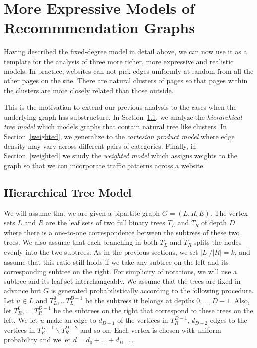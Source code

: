 \section{More Expressive Models of Recommmendation Graphs}

Having described the fixed-degree model in detail above, we can now
use it as a template for the analysis of three more richer, more
expressive and realistic models. In practice, websites can not pick
edges uniformly at random from all the other pages on the site. There
are natural clusters of pages so that pages within the clusters are
more closely related than those outside. \vs

This is the motivation to extend our previous analysis to the cases
when the underlying graph has substructure.  In
Section~\ref{hierarchy}, we analyze the {\em hierarchical tree model}
which models graphs that contain natural tree like clusters.  In
Section~\ref{weighted}, we generalize to the {\em cartesian product model}
where edge density may vary across different pairs of
categories. Finally, in Section~\ref{weighted} we study the {\em
  weighted model} which assigns weights to the graph so that we can
incorporate traffic patterns across a website.

\subsection{Hierarchical Tree Model}
\label{hierarchy}
We will assume that we are given a bipartite graph $G=(L,R,E)$. The vertex sets $L$
and $R$ are the leaf sets of two full binary trees $T_L$ and $T_R$ of
depth $D$ where there is a one-to-one correspondence between the
subtrees of these two trees. We also assume that each branching in
both $T_L$ and $T_R$ splits the nodes evenly into the two
subtrees. As in the previous sections, we set $|L|/|R|=k$, 
and assume that this ratio still holds if we take any subtree on the left 
and its corresponding subtree on the right. For simplicity of notations, we 
will use a subtree and its leaf set interchangeably. We assume that the trees are
fixed in advance but $G$ is generated probabilistically according to
the following procedure. Let $u\in L$ and $T_L^0, \ldots T^{D-1}_L$ be
the subtrees it belongs at depths $0,\ldots, D-1$. Also, let 
$T_R^0,\ldots, T_R^{D-1}$ be the subtrees on the right that correspond
to these trees on the left. We let $u$ make an edge to $d_{D-1}$ of
the vertices in $T_{R}^{D-1}$, $d_{D-2}$ edges to the vertices in 
$T_{R}^{D-1} \backslash T_{R}^{D-2}$ and so on. Each vertex is chosen
with uniform probability and we let $d = d_{0} + \ldots + d_{D-1}$.\vs

